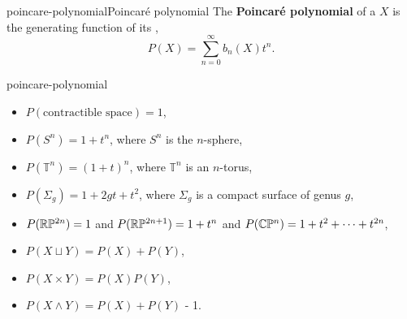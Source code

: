 \begin{topic}{poincare-polynomial}{Poincaré polynomial}
    The \textbf{Poincaré polynomial} of a  $X$ is the generating function of its ,
    \[ P(X) = \sum_{n = 0}^\infty b_n(X) t^n . \]
\end{topic}

\begin{example}{poincare-polynomial}
    \begin{itemize}
        \item $P(\text{contractible space}) = 1$,
        \item $P(S^n) = 1 + t^n$, where $S^n$ is the $n$-sphere,
        \item $P(\mathbb{T}^n) = (1 + t)^n$, where $\mathbb{T}^n$ is an $n$-torus,
        \item $P(\Sigma_g) = 1 + 2gt + t^2$, where $\Sigma_g$ is a compact surface of genus $g$,
        \item $P(\mathbb{R} \mathbb{P}^{2n}) = 1$ and $P(\mathbb{R} \mathbb{P}^{2n + 1}) = 1 + t^n$ and $P(\mathbb{C} \mathbb{P}^n) = 1 + t^2 + \cdots + t^{2n}$,
        \item $P(X \sqcup Y) = P(X) + P(Y)$,
        \item $P(X \times Y) = P(X) P(Y)$,
        \item $P(X \wedge Y) = P(X) + P(Y)$ - 1.
    \end{itemize}
\end{example}
